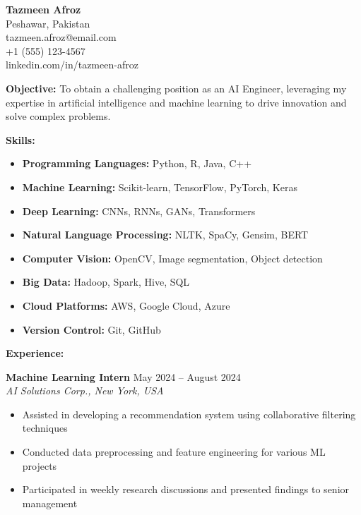 \documentclass[a4paper,12pt]{article}
\begin{document}
\vspace*{-5em}

\noindent
\begin{minipage}[t]{0.7\textwidth}
    \raggedright
    \textbf{Tazmeen Afroz} \\ %
    Peshawar, Pakistan \\
    tazmeen.afroz@email.com \\
    +1 (555) 123-4567 \\
    linkedin.com/in/tazmeen-afroz
\end{minipage}%
\hfill

\vspace{1em}
\noindent
\textbf{Objective:} To obtain a challenging position as an AI Engineer, leveraging my expertise in artificial intelligence and machine learning to drive innovation and solve complex problems.

\vspace{1em}
\noindent
\textbf{Skills:}
\begin{itemize}[leftmargin=*]
    \item \textbf{Programming Languages:} Python, R, Java, C++
    \item \textbf{Machine Learning:} Scikit-learn, TensorFlow, PyTorch, Keras
    \item \textbf{Deep Learning:} CNNs, RNNs, GANs, Transformers
    \item \textbf{Natural Language Processing:} NLTK, SpaCy, Gensim, BERT
    \item \textbf{Computer Vision:} OpenCV, Image segmentation, Object detection
    \item \textbf{Big Data:} Hadoop, Spark, Hive, SQL
    \item \textbf{Cloud Platforms:} AWS, Google Cloud, Azure
    \item \textbf{Version Control:} Git, GitHub
\end{itemize}

\textbf{Experience:}



\textbf{Machine Learning Intern} \hfill May 2024 -- August 2024 \\
\textit{AI Solutions Corp., New York, USA}
\begin{itemize}[leftmargin=*]
    \item Assisted in developing a recommendation system using collaborative filtering techniques
    \item Conducted data preprocessing and feature engineering for various ML projects
    \item Participated in weekly research discussions and presented findings to senior management
\end{itemize}
\end{document}
